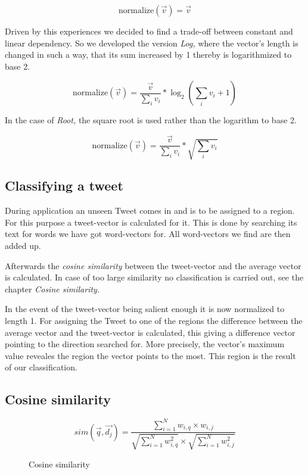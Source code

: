 \documentclass[./Main.tex]{subfiles}
\begin{document}
$$\text{normalize}(\vec v) = \vec v$$

Driven by this experiences we decided to find a trade-off between constant and linear dependency. So we developed the version \textit{Log,} where the vector's length is changed in such a way, that its sum increased by 1 thereby is logarithmized to base 2.

$$\text{normalize}(\vec v) = \frac{\vec v}{\sum_i v_i} * \log_2(\sum_i v_i+1)$$

In the case of \textit{Root,} the square root is used rather than the logarithm to base 2.

$$\text{normalize}(\vec v) = \frac{\vec v}{\sum_i v_i} * \sqrt{\sum_i v_i}$$

\subsection{Classifying a tweet}
During application an unseen Tweet comes in and is to be assigned to a region. For this purpose a tweet-vector is calculated for it. This is done by searching its text for words we have got word-vectors for. All word-vectors we find are then added up.

Afterwards the \emph{cosine similarity} between the tweet-vector and the average vector is calculated. In case of too large similarity no classification is carried out, see the chapter \textit{Cosine similarity.} 

In the event of the tweet-vector being salient enough it is now normalized to length 1. For assigning the Tweet to one of the regions the difference between the average vector and the tweet-vector is calculated, this giving a difference vector pointing to the direction searched for. More precisely, the vector's maximum value reveales the region the vector points to the most. This region is the result of our classification.

\subsection{Cosine similarity}
\begin{figure}[t]
  \[ sim(\vec{q},\vec{d_j}) = \frac{\sum^N_{i=1} w_{i,q} \times w_{i,j}}{\sqrt{\sum^N_{i=1}w^2_{i,q}} \times \sqrt{\sum^N_{i=1}w^2_{i,j}}} \]
  \caption{Cosine similarity}
  \label{cos_sim}
\end{figure}
\end{document}
